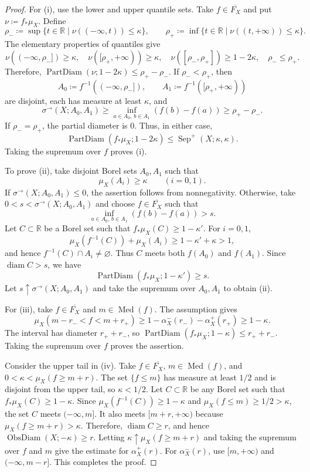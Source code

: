 \documentclass[10pt,a4paper]{amsart}
\DeclareMathOperator{\od}{ObsDiam}
\DeclareMathOperator{\pd}{PartDiam}
\newcommand{\R}{\mathbb{R}}
\begin{document}
\begin{proof}
For \textup{(i)}, use the lower and upper quantile sets.  Take
$f\in\overline{F_X}$ and put $\nu\coloneqq f_*\mu_X$.  Define
\[
\rho_-\coloneqq\sup\{t\in\R\mid\nu((-\infty,t))\leq\kappa\},\qquad
\rho_+\coloneqq\inf\{t\in\R\mid\nu((t,+\infty))\leq\kappa\}.
\]
The elementary properties of quantiles give
\[
\nu((-\infty,\rho_-])\geq\kappa,\quad
\nu([\rho_+,+\infty))\geq\kappa,\quad
\nu([\rho_-,\rho_+])\geq1-2\kappa,\quad
\rho_-\leq\rho_+.
\]
Therefore,
$\pd(\nu;1-2\kappa)\leq\rho_+-\rho_-$.  If
$\rho_-<\rho_+$, then
\[
A_0\coloneqq f^{-1}((-\infty,\rho_-]),\qquad
A_1\coloneqq f^{-1}([\rho_+,+\infty))
\]
are disjoint, each has measure at least $\kappa$, and
\[
\sigma^\to(X;A_0,A_1)
\geq\inf_{a\in A_0,\,b\in A_1}(f(b)-f(a))
\geq\rho_+-\rho_-.
\]
If $\rho_-=\rho_+$, the partial diameter is $0$.  Thus, in either case,
\[
\pd(f_*\mu_X;1-2\kappa)
\leq\operatorname{Sep}^+(X;\kappa,\kappa).
\]
Taking the supremum over $f$ proves \textup{(i)}.

To prove \textup{(ii)}, take disjoint Borel sets $A_0,A_1$ such that
\[
\mu_X(A_i)\geq\kappa\qquad(i=0,1).
\]
If
$\sigma^\to(X;A_0,A_1)\leq0$, the assertion follows from nonnegativity.
Otherwise, take $0<s<\sigma^\to(X;A_0,A_1)$ and choose
$f\in\overline{F_X}$ such that
\[
\inf_{a\in A_0,\,b\in A_1}(f(b)-f(a))>s.
\]
Let $C\subset\R$ be a Borel set such that
$f_*\mu_X(C)\geq1-\kappa'$.  For $i=0,1$,
\[
\mu_X(f^{-1}(C))+\mu_X(A_i)\geq1-\kappa'+\kappa>1,
\]
and hence $f^{-1}(C)\cap A_i\neq\varnothing$.  Thus $C$ meets both
$f(A_0)$ and $f(A_1)$.  Since $\operatorname{diam}C>s$, we have
\[
\pd(f_*\mu_X;1-\kappa')\geq s.
\]
Let $s\uparrow\sigma^\to(X;A_0,A_1)$ and take the supremum over
$A_0,A_1$ to obtain \textup{(ii)}.

For \textup{(iii)}, take $f\in\overline{F_X}$ and
$m\in\operatorname{Med}(f)$.  The assumption gives
\[
\mu_X(m-r_-<f<m+r_+)
\geq1-\alpha_X^-(r_-)-\alpha_X^+(r_+)\geq1-\kappa.
\]
The interval has diameter $r_++r_-$, so
$\pd(f_*\mu_X;1-\kappa)\leq r_++r_-$.  Taking the supremum over $f$ proves
the assertion.

Consider the upper tail in \textup{(iv)}.  Take
$f\in\overline{F_X}$, $m\in\operatorname{Med}(f)$, and
$0<\kappa<\mu_X(f\geq m+r)$.  The set $\{f\leq m\}$ has measure at least
$1/2$ and is disjoint from the upper tail, so $\kappa<1/2$.  Let
$C\subset\R$ be any Borel set such that
$f_*\mu_X(C)\geq1-\kappa$.  Since
$\mu_X(f^{-1}(C))\geq1-\kappa$ and
$\mu_X(f\leq m)\geq1/2>\kappa$, the set $C$ meets
$(-\infty,m]$.  It also meets $[m+r,+\infty)$ because
$\mu_X(f\geq m+r)>\kappa$.  Therefore,
$\operatorname{diam}C\geq r$, and hence $\od(X;-\kappa)\geq r$.  Letting
$\kappa\uparrow\mu_X(f\geq m+r)$ and taking the supremum over $f$ and $m$
give the estimate for $\alpha_X^+(r)$.  For $\alpha_X^-(r)$, use
$[m,+\infty)$ and $(-\infty,m-r]$.  This completes the proof.
\end{proof}
\end{document}
